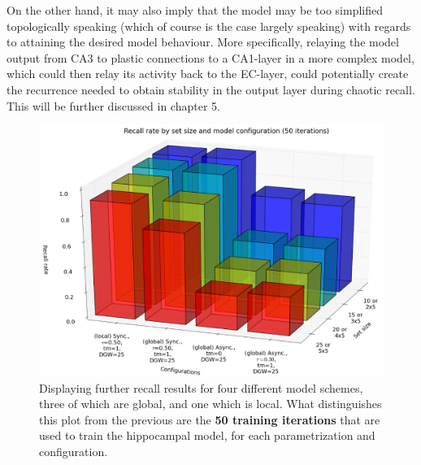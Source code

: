 On the other hand, it may also imply that the model may be too simplified topologically speaking (which of course is the case largely speaking) with regards to attaining the desired model behaviour. More specifically, relaying the model output from CA3 to plastic connections to a CA1-layer in a more complex model, which could then relay its activity back to the EC-layer, could potentially create the recurrence needed to obtain stability in the output layer during chaotic recall. This will be further discussed in chapter 5.

\begin{figure}
    \centering
    \includegraphics[width=13cm]{fig/i-iters/50-iters-recall}
    \caption{Displaying further recall results for four different model schemes, three of which are global, and one which is local. What distinguishes this plot from the previous are the \textbf{50 training iterations} that are used to train the hippocampal model, for each parametrization and configuration.}
    \label{fig:50-iters-recall}
\end{figure}


